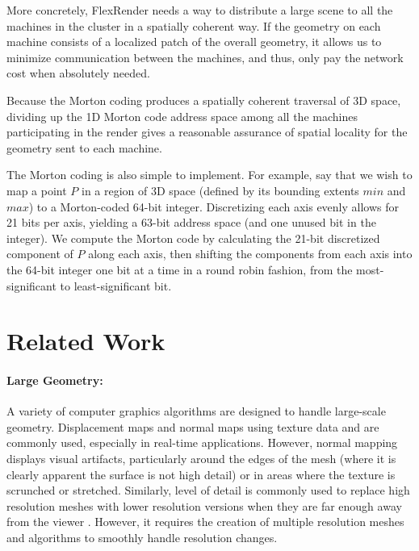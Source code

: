 \documentclass[a4paper,twoside]{article}
\begin{document}
More concretely, FlexRender needs a way to distribute a large scene to all the
machines in the cluster in a spatially coherent way. If the geometry on each
machine consists of a localized patch of the overall geometry, it allows us to
minimize communication between the machines, and thus, only pay the network cost
when absolutely needed.

Because the Morton coding produces a spatially coherent traversal of 3D space,
dividing up the 1D Morton code address space among all the machines participating
in the render gives a reasonable assurance of spatial locality for the geometry
sent to each machine.

The Morton coding is also simple to implement. For example, say that we wish to
map a point $P$ in a region of 3D space (defined by its bounding extents
$min$ and $max$) to a Morton-coded 64-bit integer. Discretizing each axis evenly
allows for 21 bits per axis, yielding a 63-bit address space (and one unused bit
in the integer). We compute the Morton code by calculating the 21-bit
discretized component of $P$ along each axis, then shifting the components from
each axis into the 64-bit integer one bit at a time in a round robin fashion, from the
most-significant to least-significant bit.

\section{Related Work}
\label{relatedwork}

\paragraph{Large Geometry:}
A variety of computer graphics algorithms are designed to handle large-scale
geometry. Displacement maps \cite{krishnamurthy:1996} and normal maps using
texture data \cite{cohen:1998} and \cite{cignoni:1998} are commonly used,
especially in real-time applications. However, normal mapping displays visual
artifacts, particularly around the edges of the mesh (where it is clearly
apparent the surface is not high detail) or in areas where the texture is
scrunched or stretched. Similarly, level of detail is commonly used to replace
high resolution meshes with lower resolution versions when they are far enough
away from the viewer \cite{clark:1976}. However, it requires the creation of
multiple resolution meshes and algorithms to smoothly handle resolution changes.
\end{document}
